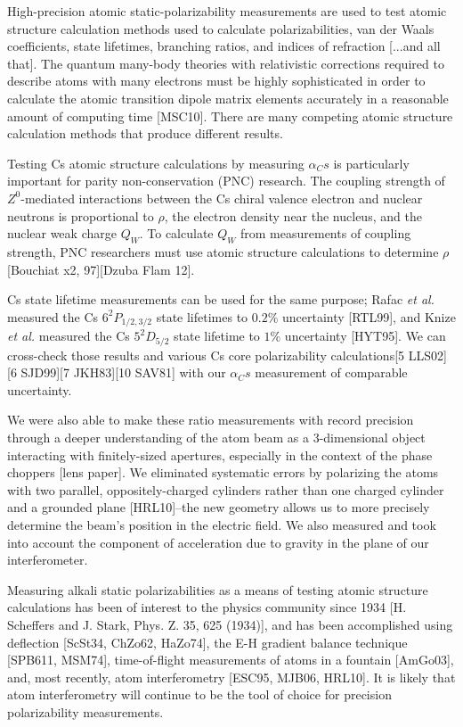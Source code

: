 \documentclass[twocolumn, prl,showpacs,superscriptaddress]{revtex4-1}   %
\begin{document}
High-precision atomic static-polarizability measurements are used to test atomic structure calculation methods used to calculate polarizabilities, van der Waals coefficients, state lifetimes, branching ratios, and indices of refraction [...and all that]. The quantum many-body theories with relativistic corrections required to describe atoms with many electrons must be highly sophisticated in order to calculate the atomic transition dipole matrix elements accurately in a reasonable amount of computing time [MSC10]. There are many competing atomic structure calculation methods that produce different results.

Testing Cs atomic structure calculations by measuring $\alpha_Cs$ is particularly important for parity non-conservation (PNC) research. The coupling strength of $Z^0$-mediated interactions between the Cs chiral valence electron and nuclear neutrons is proportional to $\rho$, the electron density near the nucleus, and the nuclear weak charge $Q_W$. To calculate $Q_W$ from measurements of coupling strength, PNC researchers must use atomic structure calculations to determine $\rho$ [Bouchiat x2, 97][Dzuba Flam 12]. 

Cs state lifetime measurements can be used for the same purpose; Rafac \textit{et al.} measured the Cs $6^2P_{1/2,3/2}$ state lifetimes to $0.2\%$ uncertainty [RTL99], and Knize \textit{et al.} measured the Cs $5^2D_{5/2}$ state lifetime to $1\%$ uncertainty [HYT95]. We can cross-check those results and various Cs core polarizability calculations[5 LLS02][6 SJD99][7 JKH83][10 SAV81] with our $\alpha_Cs$ measurement of comparable uncertainty. 

We were also able to make these ratio measurements with record precision through a deeper understanding of the atom beam as a 3-dimensional object interacting with finitely-sized apertures, especially in the context of the phase choppers [lens paper]. We eliminated systematic errors by polarizing the atoms with two parallel, oppositely-charged cylinders rather than one charged cylinder and a grounded plane [HRL10]--the new geometry allows us to more precisely determine the beam's position in the electric field.
We also measured and took into account the component of acceleration due to gravity in the plane of our interferometer.

Measuring alkali static polarizabilities as a means of testing atomic 
structure calculations has been of interest to the physics community since
1934 [H. Scheffers and J. Stark, Phys. Z. 35, 625 (1934)], and has been
accomplished using deflection [ScSt34, ChZo62, HaZo74], the E-H gradient
balance technique [SPB611, MSM74], time-of-flight measurements of atoms
in a fountain [AmGo03], and, most recently, atom interferometry 
[ESC95, MJB06, HRL10]. It is likely that atom interferometry will continue to be the tool of choice for precision polarizability measurements.
\end{document}
